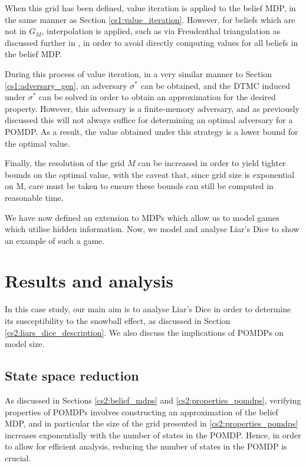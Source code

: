 When this grid has been defined, value iteration is applied to the belief MDP, in the same manner as Section \ref{cs1:value_iteration}. However, for beliefs which are not in $G_M$, interpolation is applied, such as via Freudenthal triangulation as discussed further in \cite{lovejoy_computationally_1991}, in order to avoid directly computing values for all beliefs in the belief MDP.

During this process of value iteration, in a very similar manner to Section \ref{cs1:adversary_gen}, an adversary $\sigma^*$ can be obtained, and the DTMC induced under $\sigma^*$ can be solved in order to obtain an approximation for the desired property. However, this adversary is a finite-memory adversary, and as previously discussed this will not always suffice for determining an optimal adversary for a POMDP. As a result, the value obtained under this strategy is a lower bound for the optimal value.

Finally, the resolution of the grid $M$ can be increased in order to yield tighter bounds on the optimal value, with the caveat that, since grid size is exponential on M, care must be taken to ensure these bounds can still be computed in reasonable time.

We have now defined an extension to MDPs which allow us to model games which utilise hidden information. Now, we model and analyse Liar's Dice to show an example of such a game.

\section{Results and analysis}

In this case study, our main aim is to analyse Liar's Dice in order to determine its susceptibility to the snowball effect, as discussed in Section \ref{cs2:liars_dice_description}. We also discuss the implications of POMDPs on model size.

\subsection{State space reduction}
\label{cs2:state_reduction}

As discussed in Sections \ref{cs2:belief_mdps} and \ref{cs2:properties_pomdps}, verifying properties of POMDPs involves constructing an approximation of the belief MDP, and in particular the size of the grid presented in \ref{cs2:properties_pomdps} increases exponentially with the number of states in the POMDP. Hence, in order to allow for efficient analysis, reducing the number of states in the POMDP is crucial.

